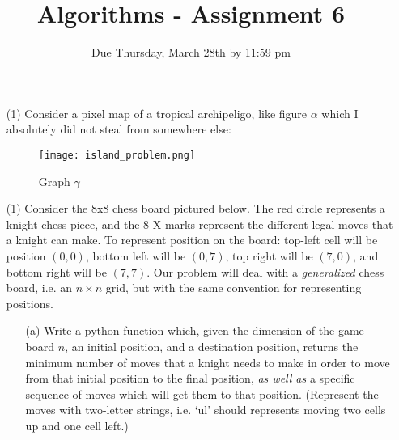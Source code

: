 \documentclass[12pt]{article}
\title{Algorithms - Assignment 6}
\date{Due Thursday, March 28th by 11:59 pm}
\begin{document}
\maketitle

\begin{enumerate}
    \item[(1)] Consider a pixel map of a tropical archipeligo, like figure $\alpha$ which I absolutely did not steal from somewhere else:
        \begin{figure}[h]
            \centering
            \texttt{[image: island\_problem.png]}
            \caption{Graph $\gamma$}
        \end{figure}
    \item[(1)] Consider the 8x8 chess board pictured below. The red circle represents a knight chess piece, and the 8 X marks represent the different legal moves that a knight can make. To represent position on the board: top-left cell will be position $(0,0)$, bottom left will be $(0,7)$, top right will be $(7,0)$, and bottom right will be $(7,7)$. Our problem will deal with a \emph{generalized} chess board, i.e. an $n \times n$ grid, but with the same convention for representing positions. \par 
    \begin{itemize}
        \item[(a)] Write a python function which, given the dimension of the game board $n$, an initial position, and a destination position, returns the minimum number of moves that a knight needs to make in order to move from that initial position to the final position, \emph{as well as} a specific sequence of moves which will get them to that position. (Represent the moves with two-letter strings, i.e. `ul' should represents moving two cells up and one cell left.) \par 
    

\end{itemize}
\end{enumerate}
\end{document}
